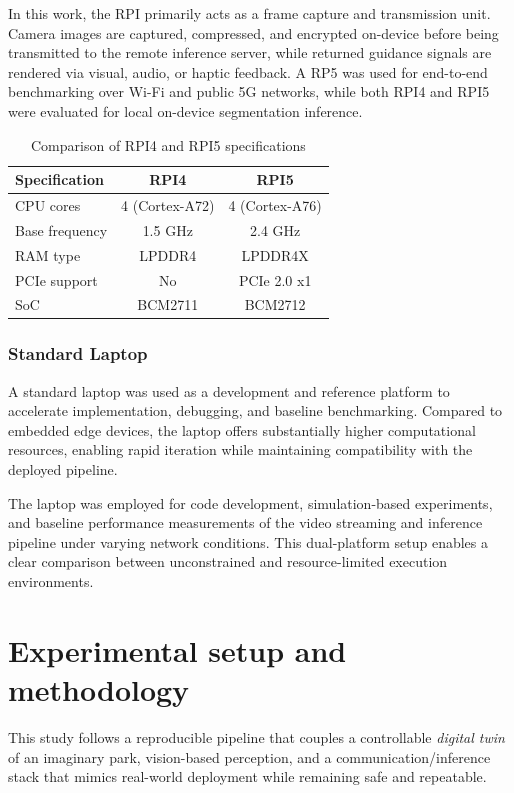 \documentclass{ieeeaccess}
\begin{document}
In this work, the RPI primarily acts as a frame capture and transmission unit. Camera images are captured, compressed, and encrypted on-device before being transmitted to the remote inference server, while returned guidance signals are rendered via visual, audio, or haptic feedback. A RP5 was used for end-to-end benchmarking over Wi-Fi and public 5G networks, while both RPI4 and RPI5 were evaluated for local on-device segmentation inference.

\begin{table}[h]
\centering
\caption{Comparison of RPI4 and RPI5 specifications}
\label{tab:rpi_comparison}
\begin{tabular}{|l|c|c|}
\hline
\textbf{Specification} & \textbf{RPI4} & \textbf{RPI5} \\ \hline
CPU cores & 4 (Cortex-A72) & 4 (Cortex-A76) \\ \hline
Base frequency & 1.5 GHz & 2.4 GHz \\ \hline
RAM type & LPDDR4 & LPDDR4X \\ \hline
PCIe support & No & PCIe 2.0 x1 \\ \hline
SoC & BCM2711 & BCM2712 \\ \hline
\end{tabular}
\end{table}

\subsubsection{Standard Laptop}
\label{sec:laptop}

A standard laptop was used as a development and reference platform to accelerate implementation, debugging, and baseline benchmarking. Compared to embedded edge devices, the laptop offers substantially higher computational resources, enabling rapid iteration while maintaining compatibility with the deployed pipeline.

The laptop was employed for code development, simulation-based experiments, and baseline performance measurements of the video streaming and inference pipeline under varying network conditions. This dual-platform setup enables a clear comparison between unconstrained and resource-limited execution environments.

\section{Experimental setup and methodology}
This study follows a reproducible pipeline that couples a controllable \emph{digital twin} of an imaginary park, vision-based perception, and a communication/inference stack that mimics real-world deployment while remaining safe and repeatable.
\end{document}

